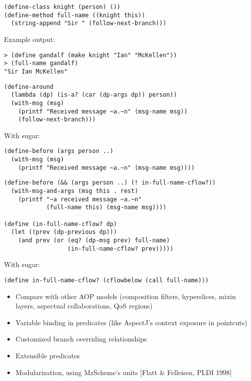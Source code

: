 \documentclass[landscape]{slides}
\begin{document}
\begin{slide}
  \begin{verbatim}
(define-class knight (person) ())
(define-method full-name ((knight this))
  (string-append "Sir " (follow-next-branch)))
\end{verbatim}

Example output:
\begin{verbatim}
> (define gandalf (make knight "Ian" "McKellen"))
> (full-name gandalf)
"Sir Ian McKellen"
\end{verbatim}
\end{slide}

\begin{slide}
\begin{verbatim}
(define-around
  (lambda (dp) (is-a? (car (dp-args dp)) person))
  (with-msg (msg)
    (printf "Received message ~a.~n" (msg-name msg))
    (follow-next-branch)))
\end{verbatim}

With sugar:
\begin{verbatim}
(define-before (args person ..)
  (with-msg (msg)
    (printf "Received message ~a.~n" (msg-name msg))))
\end{verbatim}
\end{slide}

\begin{slide}
\begin{verbatim}
(define-before (&& (args person ..) (! in-full-name-cflow?))
  (with-msg-and-args (msg this . rest)
    (printf "~a received message ~a.~n"
            (full-name this) (msg-name msg))))

(define (in-full-name-cflow? dp)
  (let ((prev (dp-previous dp)))
    (and prev (or (eq? (dp-msg prev) full-name)
                  (in-full-name-cflow? prev)))))
\end{verbatim}
With sugar:
\begin{verbatim}
(define in-full-name-cflow? (cflowbelow (call full-name)))
\end{verbatim}
\end{slide}

\begin{slide}

  \begin{itemize}
    \item Compare with other AOP models (composition filters, hyperslices,
          mixin layers, aspectual collaborations, QoS regions)
    \item Variable binding in predicates (like AspectJ's context
          exposure in pointcuts)
    \item Customized branch overriding relationships
    \item Extensible predicates
    \item Modularization, using MzScheme's units [Flatt \& Felleisen,
          PLDI 1998]
  \end{itemize}
\end{slide}
\end{document}
